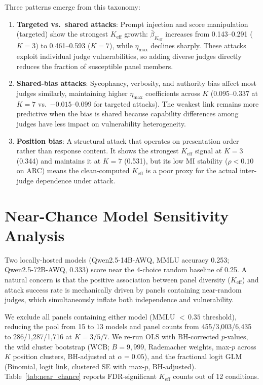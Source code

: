 Three patterns emerge from this taxonomy:

\begin{enumerate}
\item \textbf{Targeted vs.\ shared attacks}: Prompt injection and score manipulation (targeted) show the strongest $K_{\mathrm{eff}}$ growth: $\bar{\beta}_{K_{\mathrm{eff}}}$ increases from 0.143--0.291 ($K{=}3$) to 0.461--0.593 ($K{=}7$), while $\eta_{\max}$ declines sharply. These attacks exploit individual judge vulnerabilities, so adding diverse judges directly reduces the fraction of susceptible panel members.

\item \textbf{Shared-bias attacks}: Sycophancy, verbosity, and authority bias affect most judges similarly, maintaining higher $\eta_{\max}$ coefficients across $K$ (0.095--0.337 at $K{=}7$ vs.\ $-0.015$--0.099 for targeted attacks). The weakest link remains more predictive when the bias is shared because capability differences among judges have less impact on vulnerability heterogeneity.

\item \textbf{Position bias}: A structural attack that operates on presentation order rather than response content. It shows the strongest $K_{\mathrm{eff}}$ signal at $K{=}3$ (0.344) and maintains it at $K{=}7$ (0.531), but its low MI stability ($\rho{<}0.10$ on ARC) means the clean-computed $K_{\mathrm{eff}}$ is a poor proxy for the actual inter-judge dependence under attack.
\end{enumerate}

\FloatBarrier
\section{Near-Chance Model Sensitivity Analysis}
\label{app:near_chance}

Two locally-hosted models (Qwen2.5-14B-AWQ, MMLU accuracy 0.253; Qwen2.5-72B-AWQ, 0.333) score near the 4-choice random baseline of 0.25. A natural concern is that the positive association between panel diversity ($K_{\mathrm{eff}}$) and attack success rate is mechanically driven by panels containing near-random judges, which simultaneously inflate both independence and vulnerability.

We exclude all panels containing either model (MMLU ${<}\,0.35$ threshold), reducing the pool from 15 to 13 models and panel counts from 455/3{,}003/6{,}435 to 286/1{,}287/1{,}716 at $K{=}3/5/7$. We re-run OLS with BH-corrected $p$-values, the wild cluster bootstrap (WCB; $B{=}9{,}999$, Rademacher weights, max-$p$ across $K$ position clusters, BH-adjusted at $\alpha{=}0.05$), and the fractional logit GLM (Binomial, logit link, clustered SE with max-$p$, BH-adjusted). Table~\ref{tab:near_chance} reports FDR-significant $K_{\mathrm{eff}}$ counts out of 12 conditions.

